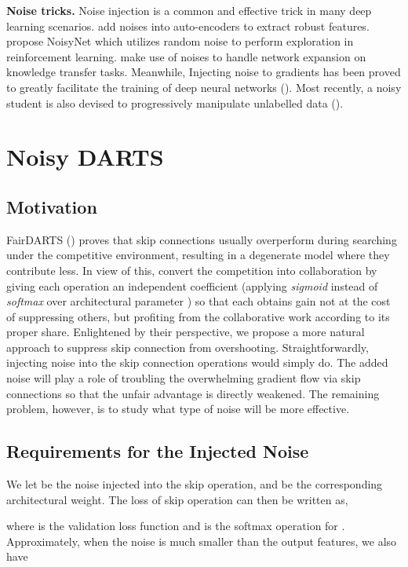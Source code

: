 \documentclass{article}
\newcommand{\citec}[1]{(\cite{#1})}
\begin{document}
\textbf{Noise tricks.}
Noise injection is a common and effective trick in many deep learning scenarios. \citet{vincent2008extracting} add noises into auto-encoders to extract robust features.  \citet{fortunato2018noisy} propose NoisyNet which utilizes random noise to perform exploration in reinforcement learning. \citet{chen2015net2net} make use of noises to handle network expansion on knowledge transfer tasks. Meanwhile, 
Injecting noise to gradients has been proved to greatly facilitate the training of deep neural networks \citec{neelakantan2015adding,zhang2019calibrated}. Most recently, a noisy student is also devised to progressively manipulate unlabelled data \citec{xie2019self}.



\section{Noisy DARTS}
\subsection{Motivation}
FairDARTS \citec{chu2019fair} proves that skip connections usually overperform during searching under the competitive environment, resulting in a degenerate model where they contribute less. In view of this, \cite{chu2019fair} convert the competition into collaboration by giving each operation an independent coefficient (applying \emph{sigmoid} instead of \emph{softmax} over architectural parameter ) so that each  obtains gain not at the cost of suppressing others, but profiting from the collaborative work according to its proper share. Enlightened by their perspective, we propose a more natural approach to suppress skip connection from overshooting. Straightforwardly, injecting noise into the skip connection operations would simply do. The added noise will play a role of troubling the overwhelming gradient flow via skip connections so that the unfair advantage is directly weakened. The remaining problem, however, is to study what type of noise will be more effective.
\subsection{Requirements for the Injected Noise}\label{theory}

We let  be the noise injected into the skip operation, and  be the corresponding architectural weight. The loss of skip operation can then be written as,

where  is the validation loss function and  is the softmax operation for . 
Approximately, when the noise is much smaller than the output features, we also have
\end{document}
